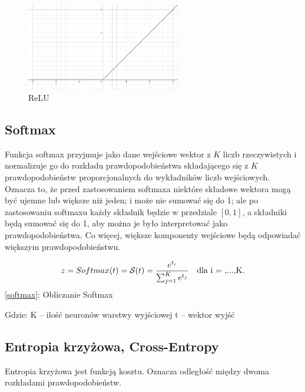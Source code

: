 \documentclass{article}
\begin{document}
\begin{figure}[H]
	\centering
	\includegraphics[width=0.6\textwidth,keepaspectratio=true]{ReLu}
	\caption{
		ReLU
	}
\end{figure}

\subsection{Softmax}
Funkcja softmax przyjmuje jako dane wejściowe wektor z $K$ liczb rzeczywistych i normalizuje go do rozkładu prawdopodobieństwa składającego się z $K$ prawdopodobieństw proporcjonalnych do wykładników liczb wejściowych. Oznacza to, że przed zastosowaniem softmaxa niektóre składowe wektora mogą być ujemne lub większe niż jeden; i może nie sumować się do 1; ale po zastosowaniu softmaxu każdy składnik będzie w przedziale $[0,1]$, a składniki będą sumować się do 1, aby można je było interpretować jako prawdopodobieństwa. Co więcej, większe komponenty wejściowe będą odpowiadać większym prawdopodobieństwu.

\begin{center}
	\begin{equation}	
		z = Softmax(t) = \mathcal{S}(t) = \dfrac{e^{t_i}}{\sum_{j=1}^{K}e^{t_j}}\text{\quad dla i = ,...,K.}
		\label{softmax}
	\end{equation}
	\ref{softmax}: Obliczanie Softmax
\end{center} 

\begin{flushleft}
	Gdzie:\newline
	K -- ilość neuronów warstwy wyjściowej\newline
	t -- wektor wyjść
	
\end{flushleft}

\subsection{Entropia krzyżowa, Cross-Entropy}
Entropia krzyżowa jest funkcją kosztu. Oznacza odległość między dwoma rozkładami prawdopodobieństw.
\end{document}
